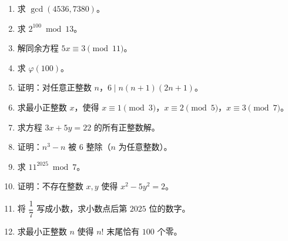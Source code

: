 \documentclass[12pt, a4paper]{ctexart}
\begin{document}
\begin{enumerate}
  \item 求 $\gcd(4536, 7380)$。
  \item 求 $2^{100} \bmod 13$。
  \item 解同余方程 $5x \equiv 3 \pmod{11}$。
  \item 求 $\varphi(100)$。
  \item 证明：对任意正整数 $n$，$6 \mid n(n+1)(2n+1)$。
  \item 求最小正整数 $x$，使得 $x \equiv 1 \pmod{3}$，$x \equiv 2 \pmod{5}$，$x \equiv 3 \pmod{7}$。
  \item 求方程 $3x + 5y = 22$ 的所有正整数解。
  \item 证明：$n^3 - n$ 被 $6$ 整除（$n$ 为任意整数）。
  \item 求 $11^{2025} \bmod 7$。
  \item 证明：不存在整数 $x, y$ 使得 $x^2 - 5y^2 = 2$。
  \item 将 $\dfrac{1}{7}$ 写成小数，求小数点后第 $2025$ 位的数字。
  \item 求最小正整数 $n$ 使得 $n!$ 末尾恰有 $100$ 个零。
\end{enumerate}

\vspace{10pt}
\end{document}
